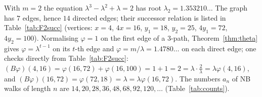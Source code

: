 \begin{example}\label{ex:F2}
With $m=2$ the equation $\lambda^3-\lambda^2+\lambda=2$ has root $\lambda_2=1.353210\ldots$ The graph has $7$ edges, hence $14$ directed edges; their successor relation is listed in Table~\ref{tab:F2succ} (vertices: $x=4$, $4x=16$, $y_1=18$, $y_2=25$, $4y_1=72$, $4y_2=100$). Normalising $\varphi=1$ on the first edge of a $3$-path, Theorem~\ref{thm:theta} gives $\varphi=\lambda^{t-1}$ on its $t$-th edge and $\varphi=m/\lambda=1.4780\ldots$ on each direct edge; one checks directly from Table~\ref{tab:F2succ}: $(B\varphi)(4,16)=\varphi(16,72)+\varphi(16,100)=1+1=2=\lambda\cdot\tfrac2\lambda=\lambda\varphi(4,16)$, and $(B\varphi)(16,72)=\varphi(72,18)=\lambda=\lambda\varphi(16,72)$. The numbers $a_n$ of NB walks of length $n$ are $14,20,28,36,48,68,92,120,\dots$ (Table~\ref{tab:counts}).
\end{example}
\begin{table}[h]
\centering\small

\caption{The edge matrix of $F_2$ ($F(4)$): every directed edge with its admissible nonbacktracking successors.}\label{tab:F2succ}
\end{table}

